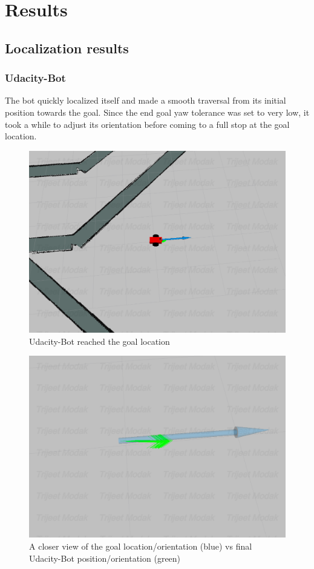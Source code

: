 \documentclass[10pt,journal,compsoc]{IEEEtran}
\begin{document}
\section{Results}
\subsection{Localization results}
\subsubsection{Udacity-Bot}
The bot quickly localized itself and made a smooth traversal from its initial position towards the goal. Since the end goal yaw tolerance was set to very low, it took a while to adjust its orientation before coming to a full stop at the goal location.

\begin{figure}[h]
    \centering
    \includegraphics[scale=0.225]{imgs/udacity-bot-goal.png}
    \centering
    \caption{Udacity-Bot reached the goal location}
    \label{fig:udacity-bot-goal}
\end{figure}

\begin{figure}[h]
    \centering
    \includegraphics[scale=0.225]{imgs/udacity-goal-orientation.png}
    \centering
    \caption{A closer view of the goal location/orientation (blue) vs final Udacity-Bot position/orientation (green)}
    \label{fig:udacity-goal-orientation}
\end{figure}
\end{document}
